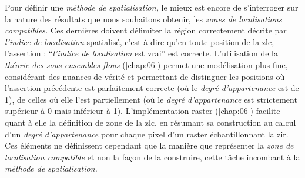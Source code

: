 Pour définir une \emph{méthode de spatialisation,} le mieux est encore de s’interroger sur la nature des résultats que nous souhaitons obtenir, les \emph{zones de localisations compatibles.} Ces dernières doivent délimiter la région correctement décrite par \emph{l'indice de localisation} spatialisé, c'est-à-dire qu'en toute position de la \ac{zlc}, l'assertion : \enquote{\emph{l'indice de localisation} est vrai} est correcte. L'utilisation de la \emph{théorie des sous-ensembles flous} (\autoref{chap:06}) permet une modélisation plus fine, considérant des nuances de vérité et permettant de distinguer les positions où l'assertion précédente est parfaitement correcte (\ie où le \emph{degré d'appartenance} est de 1), de celles où elle l'est partiellement (\ie où le \emph{degré d'appartenance} est strictement supérieur à 0 mais inférieur à 1). L'implémentation raster (\autoref{chap:06}) facilite quant à elle la définition de zone de la \ac{zlc}, en résumant sa construction au calcul d'un \emph{degré d'appartenance} pour chaque pixel d'un raster échantillonnant la \ac{zir}. Ces éléments ne définissent cependant que la manière que représenter la \emph{zone de localisation compatible} et non la façon de la construire, cette tâche incombant à la \emph{méthode de spatialisation.}

